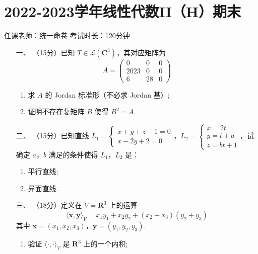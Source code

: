 \section*{2022-2023学年线性代数II（H）期末}

\begin{center}
    任课老师：统一命卷\hspace{4em} 考试时长：120分钟
\end{center}

\begin{enumerate}
	\item[一、]（15分）已知 $ T \in \mathcal{L}(\mathbf{C}^3) $，其对应矩阵为
    \[ A = \begin{pmatrix} 0 & 0 & 0 \\ 2023 & 0 & 0 \\ 6 & 28 & 0 \end{pmatrix} \]
    \begin{enumerate}[label=(\arabic*)]
        \item 求 $A$ 的 Jordan 标准形（不必求 Jordan 基）;

        \item 证明不存在复矩阵 $B$ 使得 $B^2 = A$.
    \end{enumerate}
	\item[二、]（15分）已知直线 $ L_1 = \begin{cases} x + y + z - 1 = 0 \\ x - 2y + 2 = 0 \end{cases} $，$ L_2 = \begin{cases} x = 2t \\ y = t + a \\ z = bt + 1 \end{cases} $，试确定 $ a $，$ b $ 满足的条件使得 $ L_1 $，$ L_2 $ 是：
	\begin{enumerate}[label=(\arabic*)]
        \item 平行直线;

        \item 异面直线.
    \end{enumerate}
	\item[三、]（18分）定义在 $ V = \mathbf{R}^3 $ 上的运算
    \[ \langle \boldsymbol{x}, \boldsymbol{y} \rangle_V = x_1 y_1 + x_2 y_2 + (x_2 + x_3)(y_2 + y_3) \]
    其中 $ \boldsymbol{x} = (x_1, x_2, x_3) $，$ \boldsymbol{y} = (y_1, y_2, y_3) $.
    \begin{enumerate}[label=(\arabic*)]
        \item 验证 $ \langle \cdot, \cdot \rangle_V $ 是 $ \mathbf{R}^3 $ 上的一个内积;


\end{enumerate}
\end{enumerate}
